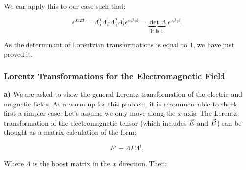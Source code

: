 We can apply this to our case such that:

\begin{equation}
	\epsilon^{0123} = \Lambda^{0}_{\alpha}\Lambda^{1}_{\beta}\Lambda^{2}_{\gamma}\Lambda^{3}_{\delta} \epsilon^{\alpha\beta\gamma\delta}= \underbrace{\det \Lambda}_{\text{It is 1}} \: \epsilon^{\alpha\beta\gamma\delta}. 
\end{equation}

As the determinant of Lorentzian transformations is equal to 1, we have just proved it.

\subsubsection{Lorentz Transformations for the Electromagnetic Field}\label{Lorentz Transformations for the Electromagnetic Field}


\textbf{a)}
We are asked to show the general Lorentz transformation of the electric and magnetic fields. As a warm-up for this problem, it is recommendable to check first a simpler case; Let's assume we only move along the $x$ axis. The Lorentz transformation of the electromagnetic tensor (which includes $\vec{E}$ and $\vec{B}$) can be thought as a matrix calculation of the form:

\begin{equation}
	F' = \Lambda F \Lambda^{t},
\end{equation}

Where $\Lambda$ is the boost matrix in the $x$ direction. Then:

